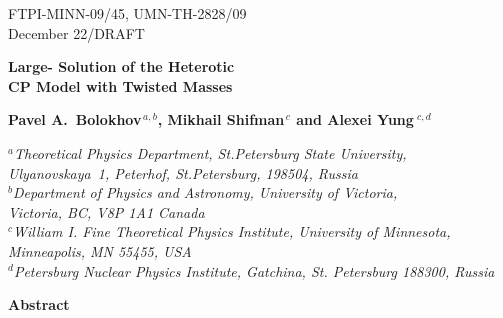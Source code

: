 \documentclass[epsfig,12pt]{article}
\begin{document}



\begin{titlepage}

\begin{flushright}
FTPI-MINN-09/45, UMN-TH-2828/09\\
December 22/DRAFT
\end{flushright}


\begin{center}
{  \Large \bf  Large- Solution of the Heterotic\\[2mm]
 CP Model with Twisted Masses}
\end{center}




\begin{center}

 {\large
 \bf   Pavel A.~Bolokhov$^{\,a,b}$,  Mikhail Shifman$^{\,c}$ and \bf Alexei Yung$^{\,\,c,d}$}
\end {center}

\begin{center}

$^a${\it Theoretical Physics Department, St.Petersburg State University, Ulyanovskaya~1, 
	 Peterhof, St.Petersburg, 198504, Russia}\\
$^b${\it Department of Physics and Astronomy, University of Victoria,\\
    Victoria, BC, V8P 1A1 Canada}\\
$^c${\it  William I. Fine Theoretical Physics Institute,
University of Minnesota,
Minneapolis, MN 55455, USA}\\
$^{d}${\it Petersburg Nuclear Physics Institute, Gatchina, St. Petersburg
188300, Russia
}
\end{center}


\begin{center}
{\large\bf Abstract}
\end{center}


\end{titlepage}
\end{document}
